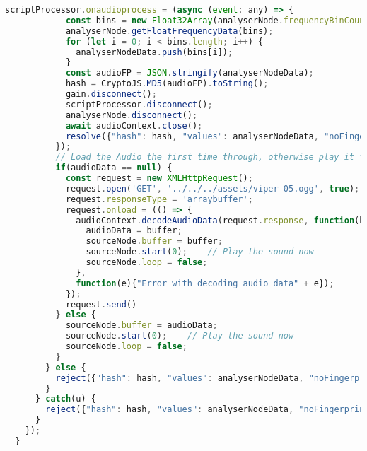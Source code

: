 \begin{lstlisting}[language=JavaScript, caption=Audio Source Hybrid fingerprint generation code, label=audioSourceHybridFingerprintGenerationCode]
          scriptProcessor.onaudioprocess = (async (event: any) => {
            const bins = new Float32Array(analyserNode.frequencyBinCount);
            analyserNode.getFloatFrequencyData(bins);
            for (let i = 0; i < bins.length; i++) {
              analyserNodeData.push(bins[i]);
            }
            const audioFP = JSON.stringify(analyserNodeData);
            hash = CryptoJS.MD5(audioFP).toString();
            gain.disconnect();
            scriptProcessor.disconnect();
            analyserNode.disconnect();
            await audioContext.close();
            resolve({"hash": hash, "values": analyserNodeData, "noFingerprint": false});
          });
          // Load the Audio the first time through, otherwise play it from the buffer
          if(audioData == null) {
            const request = new XMLHttpRequest();
            request.open('GET', '../../../assets/viper-05.ogg', true);
            request.responseType = 'arraybuffer';
            request.onload = (() => {
              audioContext.decodeAudioData(request.response, function(buffer){
                audioData = buffer;
                sourceNode.buffer = buffer;
                sourceNode.start(0);    // Play the sound now
                sourceNode.loop = false;
              },
              function(e){"Error with decoding audio data" + e});
            });
            request.send()
          } else {
            sourceNode.buffer = audioData;
            sourceNode.start(0);    // Play the sound now
            sourceNode.loop = false;
          }
        } else {
          reject({"hash": hash, "values": analyserNodeData, "noFingerprint": true});
        }  
      } catch(u) {
        reject({"hash": hash, "values": analyserNodeData, "noFingerprint": true});
      }  
    });
  }
\end{lstlisting}

